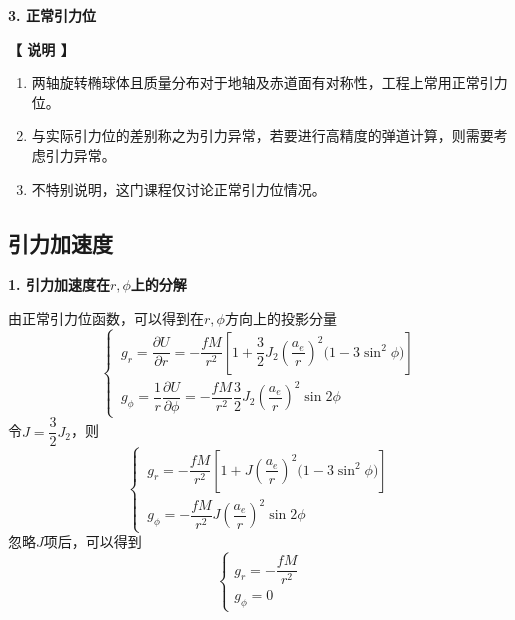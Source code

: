 \noindent \textbf{3. 正常引力位}

\noindent \textbf{【 说明 】}
\vspace*{-0.5em}
\begin{enumerate}[\hspace*{1.5em}(1) ]
	\item 两轴旋转椭球体且质量分布对于地轴及赤道面有对称性，工程上常用正常引力位。\vspace*{-0.5em}
	\item 与实际引力位的差别称之为引力异常，若要进行高精度的弹道计算，则需要考虑引力异常。\vspace*{-0.5em}
	\item 不特别说明，这门课程仅讨论正常引力位情况。
\end{enumerate}

\subsection{引力加速度}
\vspace*{-0.5em}
\noindent \textbf{1. 引力加速度在$r, \phi$上的分解}

由正常引力位函数，可以得到在$r, \phi$方向上的投影分量
\begin{equation}
	\begin{cases}
		\,g_r = \dfrac{\partial U}{\partial r} = - \dfrac{fM}{r^2}\left[1+\dfrac{3}{2} J_2 \left(\dfrac{a_e}{r}\right)^2\big(1 - 3 \sin^2 \phi\big)\right]\\[0.8em]
		\,g_\phi = \dfrac{1}{r} \dfrac{\partial U}{\partial \phi} = -\dfrac{fM}{r^2} \dfrac{3}{2}J_2 \left(\dfrac{a_e}{r}\right)^2 \sin 2\phi
	\end{cases}
\end{equation}
令$J = \dfrac{3}{2} J_2$，则
\begin{equation}
\begin{cases}
	\, g_r =  - \dfrac{fM}{r^2}\left[1+J \left(\dfrac{a_e}{r}\right)^2\big(1 - 3 \sin^2 \phi\big)\right]\\[0.8em]
	\, g_\phi =  -\dfrac{fM}{r^2} J \left(\dfrac{a_e}{r}\right)^2 \sin 2\phi
\end{cases}
\label{引力分量}
\end{equation}
忽略$J$项后，可以得到
\begin{equation}
	\begin{cases}
		g_r = - \dfrac{fM}{r^2} \\
		g_\phi = 0
	\end{cases}
\end{equation}
	
